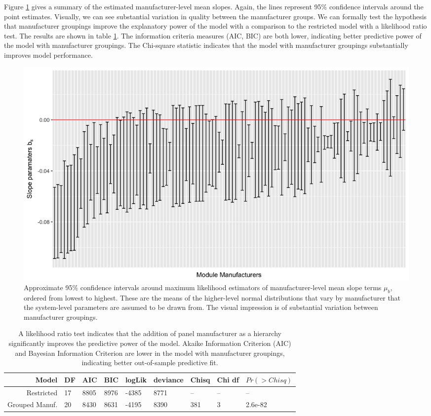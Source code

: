 \documentclass[a4paper]{article}
\begin{document}
Figure \ref{sfig:nested_manuf_fig} gives a summary of the estimated manufacturer-level mean slopes. Again, the lines represent 95\% confidence intervals around the point estimates. Visually, we can see substantial variation in quality between the manufacturer groups. We can formally test the hypothesis that manufacturer groupings improve the explanatory power of the model with a comparison to the restricted model with a likelihood ratio test. The results are shown in table \ref{tbl:lm_commodity}. The information criteria measures (AIC, BIC) are both lower, indicating better predictive power of the model with manufacturer groupings. The Chi-square statistic indicates that the model with manufacturer groupings substantially improves model performance.

\begin{figure}
  \caption{Approximate 95\% confidence intervals around maximum likelihood estimators of manufacturer-level mean slope terms $\mu_b$, ordered from lowest to highest. These are the means of the higher-level normal distributions that vary by manufacturer that the system-level parameters are assumed to be drawn from. The visual impression is of substantial variation between manufacturer groupings.  \label{sfig:nested_manuf_fig}}
  \includegraphics[width=1\linewidth]{figures/nested_manuf_fig_final.png}

\end{figure}

\begin{table}
  \begin{tabular}{rllllllll}
  \toprule
    Model &  DF &   AIC &   BIC &  logLik &  deviance &  Chisq &  Chi df &  $Pr(>Chisq)$ \\
    \midrule
             Restricted &  17 &  8805 &  8976 &   -4385 &      8771 &     -- &      -- &          -- \\
    Grouped Manuf. &  20 &  8430 &  8631 &   -4195 &      8390 &    381 &       3 &     2.6e-82 \\
  \bottomrule
  \end{tabular}

  \caption{A likelihood ratio test indicates that the addition of panel manufacturer as a hierarchy significantly improves the predictive power of the model. Akaike Information Criterion (AIC) and Bayesian Information Criterion are lower in the model with manufacturer groupings, indicating better out-of-sample predictive fit.  \label{tbl:lm_commodity}}
\end{table}
\end{document}

